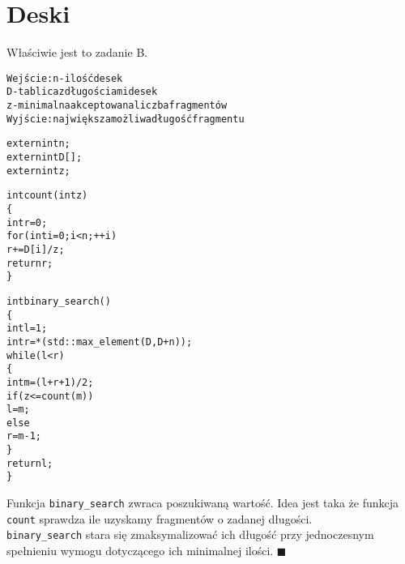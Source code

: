 \documentclass[a4paper,12pt]{article}
\begin{document}
\section{Deski}
Właściwie jest to zadanie B.
\begin{alltt}
 Wejście: n - ilość desek
          D - tablica z długościami desek
          z - minimalna akceptowana liczba fragmentów
 Wyjście: największa możliwa długość fragmentu
 
 extern int n;
 extern int D[];
 extern int z;
 
 int count(int z)
 \{
     int r = 0;
     for(int i=0 ; i<n ; ++i)
         r += D[i]/z;
     return r;
 \}
 
 int binary_search()
 \{
     int l = 1;
     int r = *(std::max_element(D, D+n));
     while(l < r)
     \{
         int m = (l+r+1)/2;
         if(z <= count(m))
             l = m;
         else
             r = m-1;
     \}
     return l;
 \}
\end{alltt}
Funkcja \verb|binary_search| zwraca poszukiwaną wartość. Idea jest taka że funkcja \verb|count| sprawdza ile uzyskamy fragmentów o zadanej długości.\\
\verb|binary_search| stara się zmaksymalizować ich długość przy jednoczesnym spełnieniu wymogu dotyczącego ich minimalnej ilości. $\blacksquare$
\end{document}
